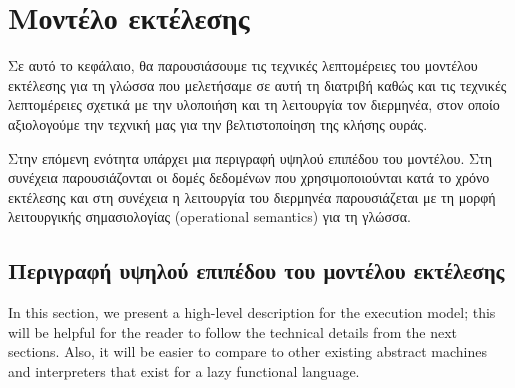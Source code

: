 \documentclass[diploma]{softlab-thesis}
\begin{document}
\chapter{Μοντέλο εκτέλεσης}

Σε αυτό το κεφάλαιο, θα παρουσιάσουμε τις τεχνικές λεπτομέρειες του μοντέλου εκτέλεσης για
τη γλώσσα που μελετήσαμε σε αυτή τη διατριβή καθώς και τις τεχνικές λεπτομέρειες σχετικά με την υλοποιήση και τη λειτουργία 
τον διερμηνέα, στον οποίο αξιολογούμε την τεχνική μας για την βελτιστοποίηση της κλήσης ουράς.

Στην επόμενη ενότητα υπάρχει μια περιγραφή υψηλού επιπέδου του μοντέλου.
Στη συνέχεια παρουσιάζονται οι δομές δεδομένων που χρησιμοποιούνται κατά το χρόνο εκτέλεσης 
και στη συνέχεια η λειτουργία του διερμηνέα παρουσιάζεται με τη μορφή λειτουργικής σημασιολογίας (operational semantics) για τη γλώσσα.


\section{Περιγραφή υψηλού επιπέδου του μοντέλου εκτέλεσης}

In this section, we present a high-level description for the execution model; this will be helpful for the reader
to follow the technical details from the next sections. Also, it will be easier to compare to other existing 
abstract machines and interpreters that exist for a lazy functional language.
\end{document}
